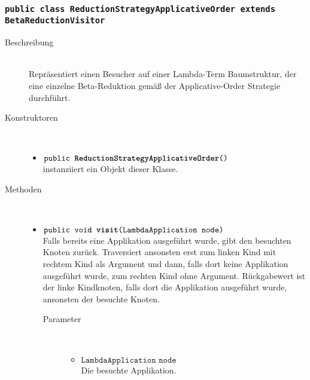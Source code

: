 \subsubsection{\normalfont \texttt{public class \textbf{ReductionStrategyApplicativeOrder} extends BetaReductionVisitor}}

\begin{description}
\item[Beschreibung] \hfill \\ Repräsentiert einen Besucher auf einer Lambda-Term Baumstruktur, der eine einzelne Beta-Reduktion gemäß der Applicative-Order Strategie durchführt.

\item[Konstruktoren] \hfill \\
	\vspace{-.8cm}
	\begin{itemize}
		\item $\texttt{public \textbf{ReductionStrategyApplicativeOrder}()}$ \\ instanziiert ein Objekt dieser Klasse.
	\end{itemize}

\item[Methoden] \hfill \\
	\vspace{-.8cm}
	\begin{itemize}
		\item $\texttt{public void \textbf{visit}(LambdaApplication node)}$ \\ Falls bereits eine Applikation ausgeführt wurde, gibt den besuchten Knoten zurück. Traversiert ansonsten erst zum linken Kind mit rechtem Kind als Argument und dann, falls dort keine Applikation ausgeführt wurde, zum rechten Kind ohne Argument. Rückgabewert ist der linke Kindknoten, falls dort die Applikation ausgeführt wurde, ansonsten der besuchte Knoten.
		\begin{description}
			\item[Parameter] \hfill \\
			\vspace{-.8cm}
			\begin{itemize}
				\item $\texttt{LambdaApplication node}$ \\ Die besuchte Applikation.
			\end{itemize}
		\end{description}
		

\end{itemize}
\end{description}
